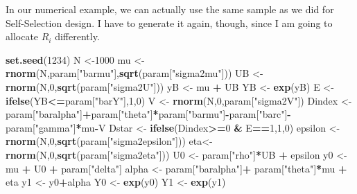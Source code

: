 \documentclass[]{book}
\newenvironment{Shaded}{\begin{snugshade}}{\end{snugshade}}
\newcommand{\KeywordTok}[1]{\textcolor[rgb]{0.13,0.29,0.53}{\textbf{#1}}}
\newcommand{\DecValTok}[1]{\textcolor[rgb]{0.00,0.00,0.81}{#1}}
\newcommand{\StringTok}[1]{\textcolor[rgb]{0.31,0.60,0.02}{#1}}
\newcommand{\OperatorTok}[1]{\textcolor[rgb]{0.81,0.36,0.00}{\textbf{#1}}}
\newcommand{\NormalTok}[1]{#1}
\theoremstyle{definition}
\theoremstyle{definition}
\theoremstyle{definition}
\theoremstyle{remark}
\let\BeginKnitrBlock\begin \let\EndKnitrBlock\end
\begin{document}
\BeginKnitrBlock{example}
\protect\hypertarget{exm:unnamed-chunk-93}{}{\label{exm:unnamed-chunk-93}
}In our numerical example, we can actually use the same sample as we did
for Self-Selection design. I have to generate it again, though, since I
am going to allocate \(R_i\) differently.
\EndKnitrBlock{example}

\begin{Shaded}
\begin{Highlighting}[]
\KeywordTok{set.seed}\NormalTok{(}\DecValTok{1234}\NormalTok{)}
\NormalTok{N <-}\DecValTok{1000}
\NormalTok{mu <-}\StringTok{ }\KeywordTok{rnorm}\NormalTok{(N,param[}\StringTok{"barmu"}\NormalTok{],}\KeywordTok{sqrt}\NormalTok{(param[}\StringTok{"sigma2mu"}\NormalTok{]))}
\NormalTok{UB <-}\StringTok{ }\KeywordTok{rnorm}\NormalTok{(N,}\DecValTok{0}\NormalTok{,}\KeywordTok{sqrt}\NormalTok{(param[}\StringTok{"sigma2U"}\NormalTok{]))}
\NormalTok{yB <-}\StringTok{ }\NormalTok{mu }\OperatorTok{+}\StringTok{ }\NormalTok{UB }
\NormalTok{YB <-}\StringTok{ }\KeywordTok{exp}\NormalTok{(yB)}
\NormalTok{E <-}\StringTok{ }\KeywordTok{ifelse}\NormalTok{(YB}\OperatorTok{<=}\NormalTok{param[}\StringTok{"barY"}\NormalTok{],}\DecValTok{1}\NormalTok{,}\DecValTok{0}\NormalTok{)}
\NormalTok{V <-}\StringTok{ }\KeywordTok{rnorm}\NormalTok{(N,}\DecValTok{0}\NormalTok{,param[}\StringTok{"sigma2V"}\NormalTok{])}
\NormalTok{Dindex <-}\StringTok{ }\NormalTok{param[}\StringTok{"baralpha"}\NormalTok{]}\OperatorTok{+}\NormalTok{param[}\StringTok{"theta"}\NormalTok{]}\OperatorTok{*}\NormalTok{param[}\StringTok{"barmu"}\NormalTok{]}\OperatorTok{-}\NormalTok{param[}\StringTok{"barc"}\NormalTok{]}\OperatorTok{-}\NormalTok{param[}\StringTok{"gamma"}\NormalTok{]}\OperatorTok{*}\NormalTok{mu}\OperatorTok{-}\NormalTok{V}
\NormalTok{Dstar <-}\StringTok{ }\KeywordTok{ifelse}\NormalTok{(Dindex}\OperatorTok{>=}\DecValTok{0} \OperatorTok{&}\StringTok{ }\NormalTok{E}\OperatorTok{==}\DecValTok{1}\NormalTok{,}\DecValTok{1}\NormalTok{,}\DecValTok{0}\NormalTok{)}
\NormalTok{epsilon <-}\StringTok{ }\KeywordTok{rnorm}\NormalTok{(N,}\DecValTok{0}\NormalTok{,}\KeywordTok{sqrt}\NormalTok{(param[}\StringTok{"sigma2epsilon"}\NormalTok{]))}
\NormalTok{eta<-}\StringTok{ }\KeywordTok{rnorm}\NormalTok{(N,}\DecValTok{0}\NormalTok{,}\KeywordTok{sqrt}\NormalTok{(param[}\StringTok{"sigma2eta"}\NormalTok{]))}
\NormalTok{U0 <-}\StringTok{ }\NormalTok{param[}\StringTok{"rho"}\NormalTok{]}\OperatorTok{*}\NormalTok{UB }\OperatorTok{+}\StringTok{ }\NormalTok{epsilon}
\NormalTok{y0 <-}\StringTok{ }\NormalTok{mu }\OperatorTok{+}\StringTok{  }\NormalTok{U0 }\OperatorTok{+}\StringTok{ }\NormalTok{param[}\StringTok{"delta"}\NormalTok{]}
\NormalTok{alpha <-}\StringTok{ }\NormalTok{param[}\StringTok{"baralpha"}\NormalTok{]}\OperatorTok{+}\StringTok{  }\NormalTok{param[}\StringTok{"theta"}\NormalTok{]}\OperatorTok{*}\NormalTok{mu }\OperatorTok{+}\StringTok{ }\NormalTok{eta}
\NormalTok{y1 <-}\StringTok{ }\NormalTok{y0}\OperatorTok{+}\NormalTok{alpha}
\NormalTok{Y0 <-}\StringTok{ }\KeywordTok{exp}\NormalTok{(y0)}
\NormalTok{Y1 <-}\StringTok{ }\KeywordTok{exp}\NormalTok{(y1)}
\end{Highlighting}
\end{Shaded}
\end{document}
